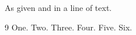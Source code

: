 \documentclass{article}
\begin{document}
As given \cite{c,a,b} and \cite{f,nokey,d,e} in a line of text.

\begin{thebibliography}{9}
 One.
 Two.
 Three.
 Four.
 Five.
 Six.
\end{thebibliography}
\end{document}
